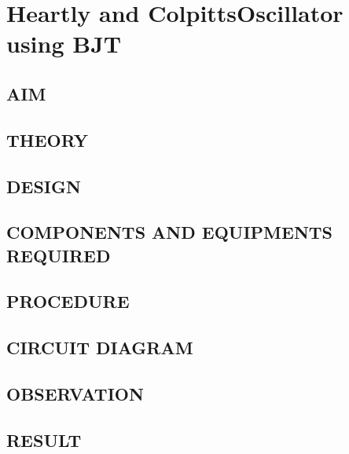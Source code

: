 \chapter[Heartly and Colpitts Oscillator using BJT] {Heartly and ColpittsOscillator using BJT}


\section*{AIM}
\section*{THEORY}
\section*{DESIGN}
\section*{COMPONENTS AND EQUIPMENTS REQUIRED}
\section*{PROCEDURE}
\section*{CIRCUIT DIAGRAM}
\section*{OBSERVATION}
\section*{RESULT}

